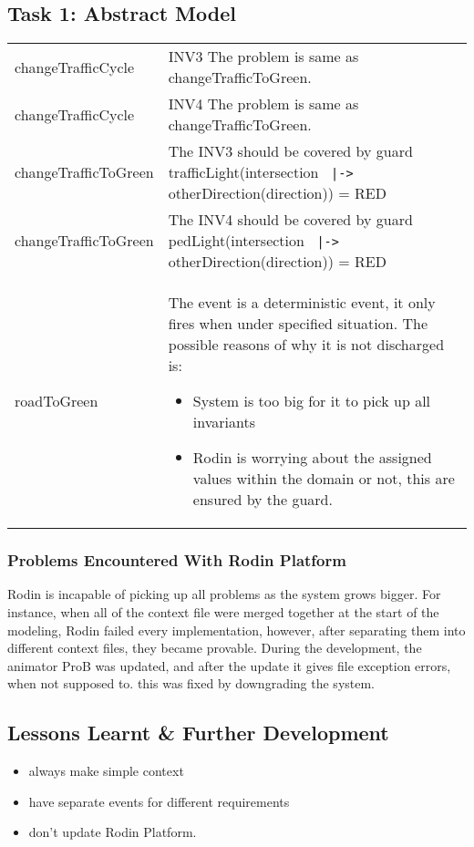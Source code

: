 \documentclass[a4paper]{article}
\begin{document}
\subsection{Task 1: Abstract Model}
\begin{center}
\begin{tabular}{|p{3.5cm}|p{10cm}|}
\hline
\color{blue}{Event} & \color{blue}{PROBLEM}\\
\hline
  changeTrafficCycle & INV3 The problem is same as changeTrafficToGreen.\\
  \hline
  changeTrafficCycle & INV4 The problem is same as changeTrafficToGreen.\\
  \hline
  changeTrafficToGreen & The INV3 should be covered by guard \linebreak trafficLight(intersection \verb+ |-> + otherDirection(direction)) = RED\\
  \hline
  changeTrafficToGreen & The INV4 should be covered by guard \linebreak pedLight(intersection \verb+ |-> + otherDirection(direction)) = RED\\
  \hline
  roadToGreen & The event is a deterministic event, it only fires when under specified situation. The possible reasons of why it is not discharged is:
  \begin{itemize}
  \item System is too big for it to pick up all invariants
  \item Rodin is worrying about the assigned values within the domain or not, this are ensured by the guard.
  \end{itemize}\\
  \hline
\end{tabular}
\end{center}

\subsubsection{Problems Encountered With Rodin Platform}
Rodin is incapable of picking up all problems as the system grows bigger.
For instance, when all of the context file were merged together at the start of the modeling, Rodin failed every implementation, however, after separating them into different context files, they became provable.
During the development, the animator ProB was updated, and after the update it gives file exception errors, when not supposed to. this was fixed by downgrading the system.
\subsection{Lessons Learnt \& Further Development}
\begin{itemize}
\item always make simple context
\item have separate events for different requirements
\item don't update Rodin Platform.
\end{itemize}
\end{document}
